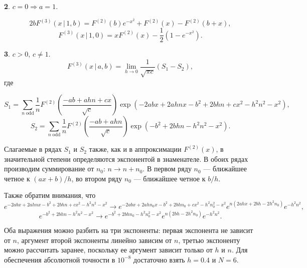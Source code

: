 \documentclass[12pt]{article}
\def\FV{F^{(2)}}
\def\FW{F^{(3)}}
\begin{document}
{\bf 2}. $c = 0 \Rightarrow a = 1$.

\begin{equation}
    2b\FW(x \, | \, 1, b) = F^{(2)}\left(b\right) e^{- x^{2}} + F^{(2)}\left(x\right) - F^{(2)}\left(b + x\right), 
\end{equation}
\begin{equation}
    \FW(x \, | \, 1, 0) = x\FV(x) - \frac{1}{2}\left(1-e^{-x^2}\right).
\end{equation}

{\bf 3}. $c > 0$, $c \neq 1$.
\begin{equation}
    \FW(x \, | \, a, b) = \lim_{h\rightarrow0} \frac{1}{\sqrt{\pi c}} \left(S_1 - S_2\right),
\end{equation}
где

\begin{equation}
    S_1 = \sum\limits_{n \; \text{odd}} \frac{1}{n} \FV\left(\frac{- a b + a h n + c x}{\sqrt{c}}\right) \exp\left(- 2 a b x + 2 a h n x - b^{2} + 2 b h n + c x^{2} - h^{2} n^{2} - x^{2}\right),
\end{equation}
\begin{equation}
    S_2 = \sum\limits_{n \; \text{odd}} \frac{1}{n} \FV\left(\frac{-ab + ahn}{\sqrt{c}}\right) \exp\left(- b^{2} + 2 b h n - h^{2} n^{2} - x^{2}\right).
\end{equation}

Слагаемые в рядах $S_1$ и $S_2$ также, как и в аппроксимации $\FV(x)$, в значительной степени определяются экспонентой в знаменателе. В обоих рядах производим суммирование от $n_0$: $n \rightarrow n + n_0$. В первом ряду $n_0$ --- ближайшее четное к $(ax+b)/h$, во втором ряду $n_0$ --- ближайшее четное к $b/h$.

Также обратим внимания, что
\begin{equation}
    e^{- 2 a b x + 2 a h n x - b^{2} + 2 b h n + c x^{2} - h^{2} n^{2} - x^{2}} \rightarrow e^{- 2 a b x + 2 a h n_{0} x - b^{2} + 2 b h n_{0} + c x^{2} - h^{2} n_{0}^{2} - x^{2}} e^{n \left(2 a h x + 2 b h - 2 h^{2} n_{0}\right)} e^{- h^{2} n^{2}},
\end{equation}
\begin{equation}
    e^{- b^{2} + 2 b h n - h^{2} n^{2} - x^{2}} \rightarrow e^{- b^{2} + 2 b h n_{0} - h^{2} n_{0}^{2} - x^{2}} e^{n \left(2 b h - 2 h^{2} n_{0}\right)} e^{- h^{2} n^{2} }.
\end{equation}

Оба выражения можно разбить на три экспоненты: первая экспонента не зависит от $n$, аргумент второй экспоненты линейно зависим от $n$, третью экспоненту можно рассчитать заранее, поскольку ее аргумент зависит только от $h$ и $n$. Для обеспечения абсолютной точности в $10^{-8}$ достаточно взять $h=0.4$ и $N=6$.
\end{document}
